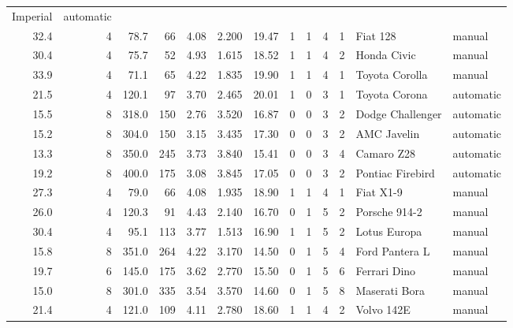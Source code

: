 \documentclass[]{article}
\begin{document}
\begin{longtable}[]{@{}rrrrrrrrrrrll@{}}
Imperial & automatic\tabularnewline
32.4 & 4 & 78.7 & 66 & 4.08 & 2.200 & 19.47 & 1 & 1 & 4 & 1 & Fiat 128 &
manual\tabularnewline
30.4 & 4 & 75.7 & 52 & 4.93 & 1.615 & 18.52 & 1 & 1 & 4 & 2 & Honda
Civic & manual\tabularnewline
33.9 & 4 & 71.1 & 65 & 4.22 & 1.835 & 19.90 & 1 & 1 & 4 & 1 & Toyota
Corolla & manual\tabularnewline
21.5 & 4 & 120.1 & 97 & 3.70 & 2.465 & 20.01 & 1 & 0 & 3 & 1 & Toyota
Corona & automatic\tabularnewline
15.5 & 8 & 318.0 & 150 & 2.76 & 3.520 & 16.87 & 0 & 0 & 3 & 2 & Dodge
Challenger & automatic\tabularnewline
15.2 & 8 & 304.0 & 150 & 3.15 & 3.435 & 17.30 & 0 & 0 & 3 & 2 & AMC
Javelin & automatic\tabularnewline
13.3 & 8 & 350.0 & 245 & 3.73 & 3.840 & 15.41 & 0 & 0 & 3 & 4 & Camaro
Z28 & automatic\tabularnewline
19.2 & 8 & 400.0 & 175 & 3.08 & 3.845 & 17.05 & 0 & 0 & 3 & 2 & Pontiac
Firebird & automatic\tabularnewline
27.3 & 4 & 79.0 & 66 & 4.08 & 1.935 & 18.90 & 1 & 1 & 4 & 1 & Fiat X1-9
& manual\tabularnewline
26.0 & 4 & 120.3 & 91 & 4.43 & 2.140 & 16.70 & 0 & 1 & 5 & 2 & Porsche
914-2 & manual\tabularnewline
30.4 & 4 & 95.1 & 113 & 3.77 & 1.513 & 16.90 & 1 & 1 & 5 & 2 & Lotus
Europa & manual\tabularnewline
15.8 & 8 & 351.0 & 264 & 4.22 & 3.170 & 14.50 & 0 & 1 & 5 & 4 & Ford
Pantera L & manual\tabularnewline
19.7 & 6 & 145.0 & 175 & 3.62 & 2.770 & 15.50 & 0 & 1 & 5 & 6 & Ferrari
Dino & manual\tabularnewline
15.0 & 8 & 301.0 & 335 & 3.54 & 3.570 & 14.60 & 0 & 1 & 5 & 8 & Maserati
Bora & manual\tabularnewline
21.4 & 4 & 121.0 & 109 & 4.11 & 2.780 & 18.60 & 1 & 1 & 4 & 2 & Volvo
142E & manual\tabularnewline
\bottomrule
\end{longtable}
\end{document}
